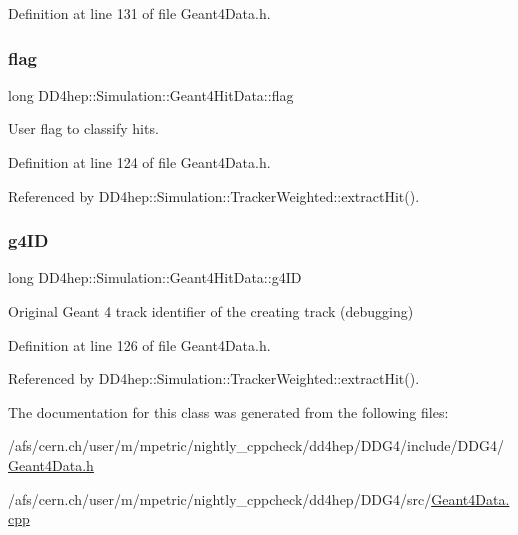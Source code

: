 Definition at line 131 of file Geant4\+Data.\+h.

\hypertarget{class_d_d4hep_1_1_simulation_1_1_geant4_hit_data_aee4dddb74fa4230f4a450f5eb96416af}{}\label{class_d_d4hep_1_1_simulation_1_1_geant4_hit_data_aee4dddb74fa4230f4a450f5eb96416af} 
\subsubsection{\texorpdfstring{flag}{flag}}
{\footnotesize\ttfamily long D\+D4hep\+::\+Simulation\+::\+Geant4\+Hit\+Data\+::flag}



User flag to classify hits. 



Definition at line 124 of file Geant4\+Data.\+h.



Referenced by D\+D4hep\+::\+Simulation\+::\+Tracker\+Weighted\+::extract\+Hit().

\hypertarget{class_d_d4hep_1_1_simulation_1_1_geant4_hit_data_adaf354d937bc941aac70b2327aa1d1f3}{}\label{class_d_d4hep_1_1_simulation_1_1_geant4_hit_data_adaf354d937bc941aac70b2327aa1d1f3} 
\subsubsection{\texorpdfstring{g4\+ID}{g4ID}}
{\footnotesize\ttfamily long D\+D4hep\+::\+Simulation\+::\+Geant4\+Hit\+Data\+::g4\+ID}



Original Geant 4 track identifier of the creating track (debugging) 



Definition at line 126 of file Geant4\+Data.\+h.



Referenced by D\+D4hep\+::\+Simulation\+::\+Tracker\+Weighted\+::extract\+Hit().



The documentation for this class was generated from the following files\+:\begin{DoxyCompactItemize}
\item 
/afs/cern.\+ch/user/m/mpetric/nightly\+\_\+cppcheck/dd4hep/\+D\+D\+G4/include/\+D\+D\+G4/\hyperlink{_geant4_data_8h}{Geant4\+Data.\+h}\item 
/afs/cern.\+ch/user/m/mpetric/nightly\+\_\+cppcheck/dd4hep/\+D\+D\+G4/src/\hyperlink{_geant4_data_8cpp}{Geant4\+Data.\+cpp}\end{DoxyCompactItemize}
